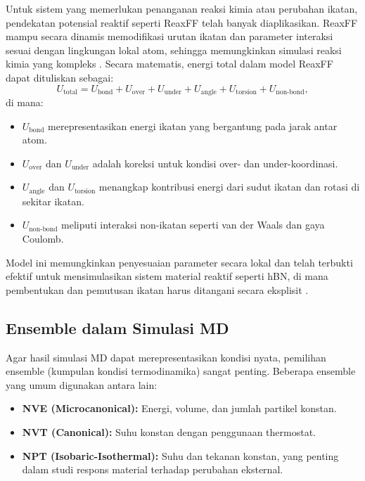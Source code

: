 Untuk sistem yang memerlukan penanganan reaksi kimia atau perubahan ikatan, pendekatan potensial reaktif seperti ReaxFF telah banyak diaplikasikan. ReaxFF mampu secara dinamis memodifikasi urutan ikatan dan parameter interaksi sesuai dengan lingkungan lokal atom, sehingga memungkinkan simulasi reaksi kimia yang kompleks \citep{Lele2022}. Secara matematis, energi total dalam model ReaxFF dapat dituliskan sebagai:
\begin{equation}
    U_{\text{total}} = U_{\text{bond}} + U_{\text{over}} + U_{\text{under}} + U_{\text{angle}} + U_{\text{torsion}} + U_{\text{non-bond}},
\end{equation}
di mana:
\begin{itemize}
    \item \( U_{\text{bond}} \) merepresentasikan energi ikatan yang bergantung pada jarak antar atom. \item \( U_{\text{over}} \) dan \( U_{\text{under}} \) adalah koreksi untuk kondisi over- dan under-koordinasi. \item \( U_{\text{angle}} \) dan \( U_{\text{torsion}} \) menangkap kontribusi energi dari sudut ikatan dan rotasi di sekitar ikatan. \item \( U_{\text{non-bond}} \) meliputi interaksi non-ikatan seperti van der Waals dan gaya Coulomb. \end{itemize}
Model ini memungkinkan penyesuaian parameter secara lokal dan telah terbukti efektif untuk mensimulasikan sistem material reaktif seperti hBN, di mana pembentukan dan pemutusan ikatan harus ditangani secara eksplisit \citep{Lele2022}. \subsection{Ensemble dalam Simulasi MD}
Agar hasil simulasi MD dapat merepresentasikan kondisi nyata, pemilihan ensemble (kumpulan kondisi termodinamika) sangat penting. Beberapa ensemble yang umum digunakan antara lain:
\begin{itemize}
    \item \textbf{NVE (Microcanonical):} Energi, volume, dan jumlah partikel konstan. \item \textbf{NVT (Canonical):} Suhu konstan dengan penggunaan thermostat.
    \item \textbf{NPT (Isobaric-Isothermal):} Suhu dan tekanan konstan, yang penting dalam studi respons material terhadap perubahan eksternal. \end{itemize}

